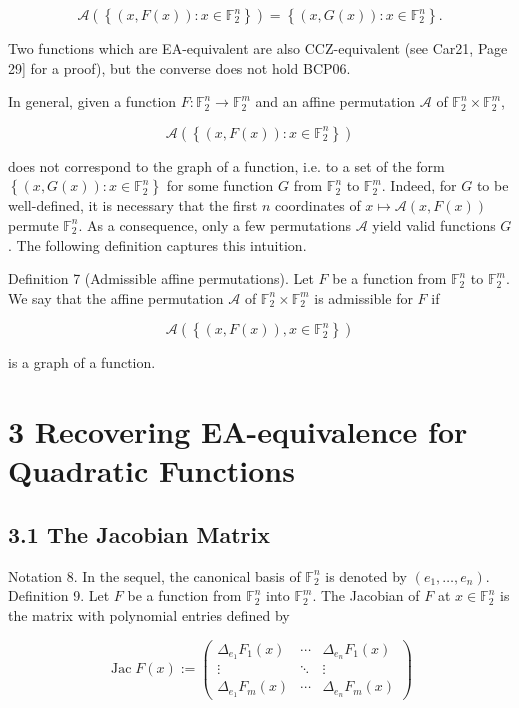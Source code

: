 \documentclass[10pt]{article}
\begin{document}
$$
\mathcal{A}\left(\left\{(x, F(x)): x \in \mathbb{F}_{2}^{n}\right\}\right)=\left\{(x, G(x)): x \in \mathbb{F}_{2}^{n}\right\} .
$$

Two functions which are EA-equivalent are also CCZ-equivalent (see Car21, Page 29] for a proof), but the converse does not hold BCP06.

In general, given a function $F: \mathbb{F}_{2}^{n} \rightarrow \mathbb{F}_{2}^{m}$ and an affine permutation $\mathcal{A}$ of $\mathbb{F}_{2}^{n} \times \mathbb{F}_{2}^{m}$,

$$
\mathcal{A}\left(\left\{(x, F(x)): x \in \mathbb{F}_{2}^{n}\right\}\right)
$$

does not correspond to the graph of a function, i.e. to a set of the form $\left\{(x, G(x)): x \in \mathbb{F}_{2}^{n}\right\}$ for some function $G$ from $\mathbb{F}_{2}^{n}$ to $\mathbb{F}_{2}^{m}$. Indeed, for $G$ to be well-defined, it is necessary that the first $n$ coordinates of $x \mapsto \mathcal{A}(x, F(x))$ permute $\mathbb{F}_{2}^{n}$. As a consequence, only a few permutations $\mathcal{A}$ yield valid functions $G$. The following definition captures this intuition.

Definition 7 (Admissible affine permutations). Let $F$ be a function from $\mathbb{F}_{2}^{n}$ to $\mathbb{F}_{2}^{m}$. We say that the affine permutation $\mathcal{A}$ of $\mathbb{F}_{2}^{n} \times \mathbb{F}_{2}^{m}$ is admissible for $F$ if

$$
\mathcal{A}\left(\left\{(x, F(x)), x \in \mathbb{F}_{2}^{n}\right\}\right)
$$

is a graph of a function.

\section*{3 Recovering EA-equivalence for Quadratic Functions}
\subsection*{3.1 The Jacobian Matrix}
Notation 8. In the sequel, the canonical basis of $\mathbb{F}_{2}^{n}$ is denoted by $\left(e_{1}, \ldots, e_{n}\right)$.\\
Definition 9. Let $F$ be a function from $\mathbb{F}_{2}^{n}$ into $\mathbb{F}_{2}^{m}$. The Jacobian of $F$ at $x \in \mathbb{F}_{2}^{n}$ is the matrix with polynomial entries defined by

\[
\operatorname{Jac} F(x):=\left(\begin{array}{ccc}
\Delta_{e_{1}} F_{1}(x) & \cdots & \Delta_{e_{n}} F_{1}(x)  \tag{1}\\
\vdots & \ddots & \vdots \\
\Delta_{e_{1}} F_{m}(x) & \cdots & \Delta_{e_{n}} F_{m}(x)
\end{array}\right)
\]
\end{document}
